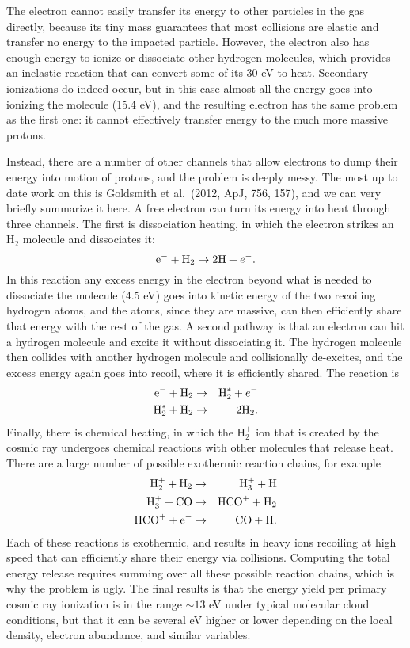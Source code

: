 The electron cannot easily transfer its energy to other particles in the gas directly, because its tiny mass guarantees that most collisions are elastic and transfer no energy to the impacted particle. However, the electron also has enough energy to ionize or dissociate other hydrogen molecules, which provides an inelastic reaction that can convert some of its 30 eV to heat. Secondary ionizations do indeed occur, but in this case almost all the energy goes into ionizing the molecule (15.4 eV), and the resulting electron has the same problem as the first one: it cannot effectively transfer energy to the much more massive protons.

Instead, there are a number of other channels that allow electrons to dump their energy into motion of protons, and the problem is deeply messy. The most up to date work on this is Goldsmith et al.~(2012, ApJ, 756, 157), and we can very briefly summarize it here. A free electron can turn its energy into heat through three channels. The first is dissociation heating, in which the electron strikes an H$_2$ molecule and dissociates it:
\begin{equation}
\mbox{e}^- + {\rm H}_2 \rightarrow 2{\rm H} + e^{-}.
\end{equation}
In this reaction any excess energy in the electron beyond what is needed to dissociate the molecule (4.5 eV) goes into kinetic energy of the two recoiling hydrogen atoms, and the atoms, since they are massive, can then efficiently share that energy with the rest of the gas. A second pathway is that an electron can hit a hydrogen molecule and excite it without dissociating it. The hydrogen molecule then collides with another hydrogen molecule and collisionally de-excites, and the excess energy again goes into recoil, where it is efficiently shared. The reaction is
\begin{eqnarray}
\mbox{e}^- + {\rm H}_2 & \rightarrow & {\rm H}_2^* + e^{-} \\
{\rm H}_2^* + {\rm H}_2 & \rightarrow & 2 {\rm H}_2.
\end{eqnarray}
Finally, there is chemical heating, in which the H$_2^+$ ion that is created by the cosmic ray undergoes chemical reactions with other molecules that release heat. There are a large number of possible exothermic reaction chains, for example
\begin{eqnarray}
{\rm H}_2^+ + {\rm H}_2 & \rightarrow & {\rm H}_3^+ + {\rm H} \\
{\rm H}_3^+ + {\rm CO} & \rightarrow & {\rm HCO}^+ + {\rm H}_2 \\
{\rm HCO}^+ + {\rm e}^- & \rightarrow & {\rm CO} + {\rm H}.
\end{eqnarray}
Each of these reactions is exothermic, and results in heavy ions recoiling at high speed that can efficiently share their energy via collisions. Computing the total energy release requires summing over all these possible reaction chains, which is why the problem is ugly. The final results is that the energy yield per primary cosmic ray ionization is in the range $\sim 13$ eV under typical molecular cloud conditions, but that it can be several eV higher or lower depending on the local density, electron abundance, and similar variables.

